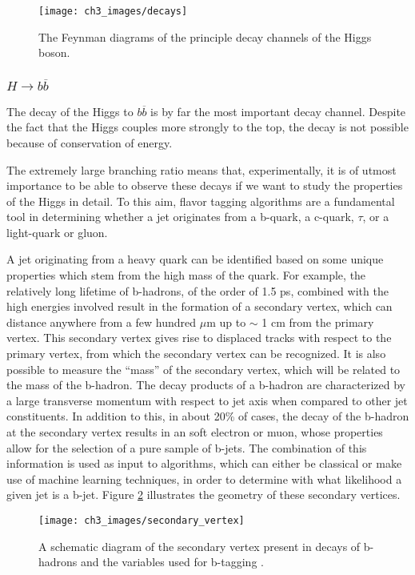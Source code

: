 \documentclass[10pt,a4paper]{book}
\begin{document}
\begin{figure}
\centering
\texttt{[image: ch3\_images/decays]}
\caption{The Feynman diagrams of the principle decay channels of the Higgs boson.}
\label{decays}
\end{figure}

\subsubsection{$H\rightarrow b\overline{b}$}

The decay of the Higgs to $b\overline{b}$ is by far the most important decay channel. Despite the fact that the Higgs couples more strongly to the top, the decay is not possible because of conservation of energy. 

The extremely large branching ratio means that, experimentally, it is of utmost importance to be able to observe these decays if we want to study the properties of the Higgs in detail. To this aim, flavor tagging algorithms are a fundamental tool in determining whether a jet originates from a b-quark, a c-quark, $\tau$, or a light-quark or gluon. 

A jet originating from a heavy quark can be identified based on some unique properties which stem from the high mass of the quark. For example, the relatively long lifetime of b-hadrons, of the order of 1.5 ps, combined with the high energies involved result in the formation of a secondary vertex, which can distance anywhere from a few hundred $\mu$m up to $\sim$ 1 cm from the primary vertex. This secondary vertex gives rise to displaced tracks with respect to the primary vertex, from which the secondary vertex can be recognized. It is also possible to measure the ``mass'' of the secondary vertex, which will be related to the mass of the b-hadron. The decay products of a b-hadron are characterized by a large transverse momentum with respect to jet axis when compared to other jet constituents. In addition to this, in about 20\% of cases, the decay of the b-hadron at the secondary vertex results in an soft electron or muon, whose properties allow for the selection of a pure sample of b-jets. The combination of this information is used as input to algorithms, which can either be classical or make use of machine learning techniques, in order to determine with what likelihood a given jet is a b-jet. Figure \ref{secondary vertex} illustrates the geometry of these secondary vertices.
\begin{figure}
\centering
\texttt{[image: ch3\_images/secondary\_vertex]}
\caption{A schematic diagram of the secondary vertex present in decays of b-hadrons and the variables used for b-tagging \cite{CMS:2017wtu}.}
\label{secondary vertex}
\end{figure}
\end{document}
